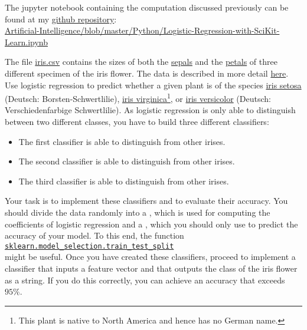 The jupyter notebook containing the computation discussed previously can be found at my \href{https://github.com/karlstroetmann/Artificial-Intelligence}{github repository}:
\\[0.2cm]
\hspace*{1.3cm}
\href{https://github.com/karlstroetmann/Artificial-Intelligence/blob/master/Python/Logistic-Regression-with-SciKit-Learn.ipynb}
{Artificial-Intelligence/blob/master/Python/Logistic-Regression-with-SciKit-Learn.ipynb}

\exercise 
The file \href{https://github.com/karlstroetmann/Artificial-Intelligence/blob/master/Python/iris.csv}{iris.csv}
contains the sizes of both the \href{https://en.wikipedia.org/wiki/Sepal}{sepals} and the
\href{https://en.wikipedia.org/wiki/Pepal}{petals} of three different specimen of the iris flower.  The
data is described in more detail \href{https://en.wikipedia.org/wiki/Iris_flower_data_set}{here}. 
Use logistic regression to predict whether a given plant is of the species
\href{https://en.wikipedia.org/wiki/Iris_setosa}{iris setosa} (Deutsch: Borsten-Schwertlilie),
\href{https://en.wikipedia.org/wiki/Iris_virginica}{iris virginica}\footnote{
This plant is native to North America and hence has no German name.}, or
\href{https://en.wikipedia.org/wiki/Iris_versicolor}{iris versicolor} (Deutsch: Verschiedenfarbige Schwertlilie).
As logistic regression is only able to distinguish between two different classes, you
have to build three different classifiers:
\begin{itemize}
\item The first classifier is able to distinguish  from other irises. 
\item The second classifier is able to distinguish  from other irises. 
\item The third classifier is able to distinguish  from other irises. 
\end{itemize}
Your task is to implement these classifiers and to evaluate their accuracy.  
You should  divide the data randomly into a , which is used for computing the
coefficients of logistic regression and a , which you should only use to predict the
accuracy of your model.  To this end, the function
\\[0.2cm]
\hspace*{1.3cm}
\href{https://scikit-learn.org/stable/modules/generated/sklearn.model_selection.train_test_split.html}{\texttt{sklearn.model\_selection.train\_test\_split}}
\\[0.2cm]
might be useful.  Once you have created these classifiers, proceed to implement a classifier that inputs a
feature vector and that outputs the class of the iris flower as a string.  If you do this correctly, you can
achieve an accuracy that exceeds $95\%$.
\eox

